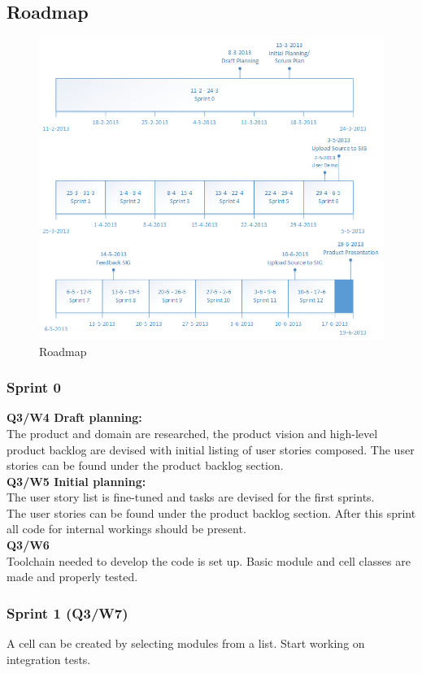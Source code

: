 \documentclass[10pt,a4paper]{report}
\begin{document}
		\subsection{Roadmap}
			\begin{figure}[htb]
			\centerline{\includegraphics[scale=1]{Roadmap.png}}
			\caption{Roadmap}
			\label{fig: Roadmap}
			\end{figure}	
			\subsubsection*{Sprint 0}
				\textbf{Q3/W4 Draft planning:}\\ The product and domain are researched, the product vision and high-level product backlog are devised with initial listing of user stories composed. The user stories can be found under the product backlog section.\\
				\textbf{Q3/W5 Initial planning:}\\ The user story list is fine-tuned and tasks are devised for the first sprints.\\
				The user stories can be found under the product backlog section. After this sprint all code for internal workings should be present.\\		
				\textbf{Q3/W6}\\
				Toolchain needed to develop the code is set up. Basic module and cell classes are made and properly tested.
			\subsubsection*{Sprint 1 (Q3/W7)}
				A cell can be created by selecting modules from a list. Start working on integration tests.
\end{document}
